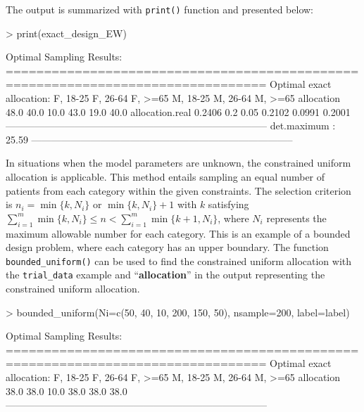 The output is summarized with \texttt{print()} function and presented below:
\begin{example}
  > print(exact_design_EW)

  Optimal Sampling Results:
  ================================================================================
  Optimal exact allocation:
  F, 18-25 F, 26-64 F, >=65 M, 18-25 M, 26-64 M, >=65
  allocation      48.0     40.0     10.0    43.0     19.0     40.0
  allocation.real 0.2406   0.2      0.05    0.2102   0.0991   0.2001
  --------------------------------------------------------------------------------
  det.maximum :
  25.59
  --------------------------------------------------------------------------------
\end{example}


In situations when the model parameters are unknown, the constrained uniform allocation is applicable. This method entails sampling an equal number of patients from each category within the given constraints. The selection criterion is $n_i = \min\{k, N_i\}$ or $\min\{k, N_i\}+1$ with $k$ satisfying $\sum_{i=1}^m \min\{k, N_i\} \leq n < \sum_{i=1}^m \min\{k+1, N_i\}$, where $N_i$ represents the maximum allowable number for each category. This is an example of a bounded design problem, where each category has an upper boundary. The function \texttt{bounded\_uniform()} can be used to find the constrained uniform allocation with the \texttt{trial\_data} example and ``\textbf{allocation}'' in the output representing the constrained uniform allocation.

\begin{example}
  > bounded_uniform(Ni=c(50, 40, 10, 200, 150, 50), nsample=200, label=label)

  Optimal Sampling Results:
  ================================================================================
  Optimal exact allocation:
  F, 18-25 F, 26-64 F, >=65 M, 18-25 M, 26-64 M, >=65
  allocation 38.0     38.0     10.0    38.0     38.0     38.0
  --------------------------------------------------------------------------------
\end{example}

